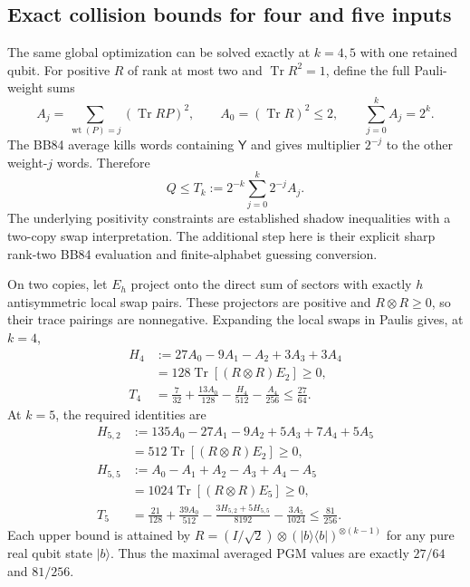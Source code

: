\documentclass[11pt,a4paper]{article}
\newcommand{\Tr}{\operatorname{Tr}}
\newcommand{\ket}[1]{\lvert #1\rangle}
\newcommand{\bra}[1]{\langle #1\rvert}
\newcommand{\YY}{\mathsf Y}
\begin{document}
\subsection{Exact collision bounds for four and five inputs}
The same global optimization can be solved exactly at $k=4,5$ with one retained qubit. For positive $R$ of rank at most two and $\Tr R^2=1$, define the full Pauli-weight sums
\[
A_j=\sum_{\operatorname{wt}(P)=j}(\Tr RP)^2,\qquad
A_0=(\Tr R)^2\le2,\qquad \sum_{j=0}^{k}A_j=2^k.
\]
The BB84 average kills words containing $\YY$ and gives multiplier $2^{-j}$ to the other weight-$j$ words. Therefore
\[
Q\le T_k:=2^{-k}\sum_{j=0}^k2^{-j}A_j.
\]
The underlying positivity constraints are established shadow inequalities with a two-copy swap interpretation. The additional step here is their explicit sharp rank-two BB84 evaluation and finite-alphabet guessing conversion.

On two copies, let $E_h$ project onto the direct sum of sectors with exactly $h$ antisymmetric local swap pairs. These projectors are positive and $R\otimes R\ge0$, so their trace pairings are nonnegative. Expanding the local swaps in Paulis gives, at $k=4$,
\begin{align*}
H_4&:=27A_0-9A_1-A_2+3A_3+3A_4\\
&=128\Tr[(R\otimes R)E_2]\ge0,\\
T_4&=\frac7{32}+\frac{13A_0}{128}-\frac{H_4}{512}-\frac{A_4}{256}
\le\frac{27}{64}.
\end{align*}
At $k=5$, the required identities are
\begin{align*}
H_{5,2}&:=135A_0-27A_1-9A_2+5A_3+7A_4+5A_5\\
&=512\Tr[(R\otimes R)E_2]\ge0,\\
H_{5,5}&:=A_0-A_1+A_2-A_3+A_4-A_5\\
&=1024\Tr[(R\otimes R)E_5]\ge0,\\
T_5&=\frac{21}{128}+\frac{39A_0}{512}
-\frac{3H_{5,2}+5H_{5,5}}{8192}-\frac{3A_5}{1024}
\le\frac{81}{256}.
\end{align*}
Each upper bound is attained by
$R=(I/\sqrt2)\otimes(\ket b\bra b)^{\otimes(k-1)}$
for any pure real qubit state $\ket b$. Thus the maximal averaged PGM values are exactly $27/64$ and $81/256$.
\end{document}

